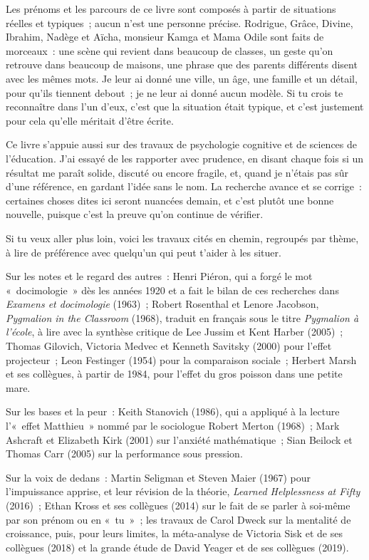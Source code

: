 \documentclass[10.5pt,twoside,openright]{book}
\newcommand{\chapitresn}[1]{\cleardoublepage\markright{#1}\thispagestyle{plain}\vspace*{2.8cm}{\noindent\LARGE\bfseries #1\par}\vspace{1.6em}\noindent\ignorespaces}
\begin{document}
\chapitresn{Note de l’auteur}

Les prénoms et les parcours de ce livre sont composés à partir de situations réelles et typiques ; aucun n’est une personne précise. Rodrigue, Grâce, Divine, Ibrahim, Nadège et Aïcha, monsieur Kamga et Mama Odile sont faits de morceaux : une scène qui revient dans beaucoup de classes, un geste qu’on retrouve dans beaucoup de maisons, une phrase que des parents différents disent avec les mêmes mots. Je leur ai donné une ville, un âge, une famille et un détail, pour qu’ils tiennent debout ; je ne leur ai donné aucun modèle. Si tu crois te reconnaître dans l’un d’eux, c’est que la situation était typique, et c’est justement pour cela qu’elle méritait d’être écrite.

Ce livre s’appuie aussi sur des travaux de psychologie cognitive et de sciences de l’éducation. J’ai essayé de les rapporter avec prudence, en disant chaque fois si un résultat me paraît solide, discuté ou encore fragile, et, quand je n’étais pas sûr d’une référence, en gardant l’idée sans le nom. La recherche avance et se corrige : certaines choses dites ici seront nuancées demain, et c’est plutôt une bonne nouvelle, puisque c’est la preuve qu’on continue de vérifier.

Si tu veux aller plus loin, voici les travaux cités en chemin, regroupés par thème, à lire de préférence avec quelqu’un qui peut t’aider à les situer.

Sur les notes et le regard des autres : Henri Piéron, qui a forgé le mot « docimologie » dès les années 1920 et a fait le bilan de ces recherches dans \emph{Examens et docimologie} (1963) ; Robert Rosenthal et Lenore Jacobson, \emph{Pygmalion in the Classroom} (1968), traduit en français sous le titre \emph{Pygmalion à l’école}, à lire avec la synthèse critique de Lee Jussim et Kent Harber (2005) ; Thomas Gilovich, Victoria Medvec et Kenneth Savitsky (2000) pour l’effet projecteur ; Leon Festinger (1954) pour la comparaison sociale ; Herbert Marsh et ses collègues, à partir de 1984, pour l’effet du gros poisson dans une petite mare.

Sur les bases et la peur : Keith Stanovich (1986), qui a appliqué à la lecture l’« effet Matthieu » nommé par le sociologue Robert Merton (1968) ; Mark Ashcraft et Elizabeth Kirk (2001) sur l’anxiété mathématique ; Sian Beilock et Thomas Carr (2005) sur la performance sous pression.

Sur la voix de dedans : Martin Seligman et Steven Maier (1967) pour l’impuissance apprise, et leur révision de la théorie, \emph{Learned Helplessness at Fifty} (2016) ; Ethan Kross et ses collègues (2014) sur le fait de se parler à soi-même par son prénom ou en « tu » ; les travaux de Carol Dweck sur la mentalité de croissance, puis, pour leurs limites, la méta-analyse de Victoria Sisk et de ses collègues (2018) et la grande étude de David Yeager et de ses collègues (2019).
\end{document}
